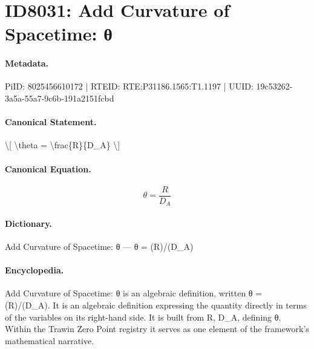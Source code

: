 \section*{ID8031: Add Curvature of Spacetime: θ}
\paragraph{Metadata.}
PiID: 8025456610172 | RTEID: RTE:P31186.1565:T1.1197 | UUID: 19c53262-3a5a-55a7-9c6b-191a2151fcbd

\paragraph{Canonical Statement.}
\textbackslash{}[ \textbackslash{}theta = \textbackslash{}frac\{R\}\{D\_A\} \textbackslash{}]

\paragraph{Canonical Equation.}
\[
\theta = \frac{R}{D_A}
\]

\paragraph{Dictionary.}
Add Curvature of Spacetime: θ — θ = (R)/(D\_A)

\paragraph{Encyclopedia.}
Add Curvature of Spacetime: θ is an algebraic definition, written θ = (R)/(D\_A). It is an algebraic definition expressing the quantity directly in terms of the variables on its right-hand side. It is built from R, D\_A, defining θ. Within the Trawin Zero Point registry it serves as one element of the framework's mathematical narrative.
